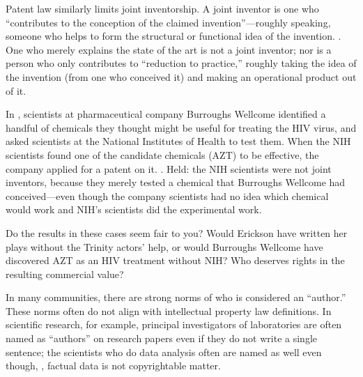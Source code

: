 



\item Patent law similarly limits joint inventorship.
A joint inventor is one who ``contributes to the
conception of the claimed invention''---roughly speaking, someone who helps to
form the structural or functional idea of the invention.
. One who merely explains the state
of the art is not a joint inventor; nor is a person who only contributes to
``reduction to practice,'' roughly taking the idea of the invention (from one
who conceived it) and making an operational product out of it.

In , scientists at pharmaceutical company
Burroughs Wellcome identified a handful of chemicals they thought might be
useful for treating the HIV virus, and asked scientists at the National
Institutes of Health to test them. When the NIH scientists found one of the
candidate chemicals (AZT) to be effective, the company applied for a patent on
it. . Held: the NIH scientists were
not joint inventors, because they merely tested a chemical that Burroughs
Wellcome had conceived---even though the company scientists had no idea which
chemical would work and NIH's scientists did the experimental work.

Do the results in these cases seem fair to you? Would Erickson have written her
plays without the Trinity actors' help, or would Burroughs Wellcome have
discovered AZT as an HIV treatment without NIH\@? Who deserves rights in the
resulting commercial value?


\item In many communities, there are strong norms of who is considered an
``author.'' These norms often do not align with intellectual property law
definitions. In scientific research, for example, principal investigators of
laboratories are often named as ``authors'' on research papers even if they do
not write a single sentence; the scientists who do data analysis often are named
as well even though, , factual
data is not copyrightable matter.

